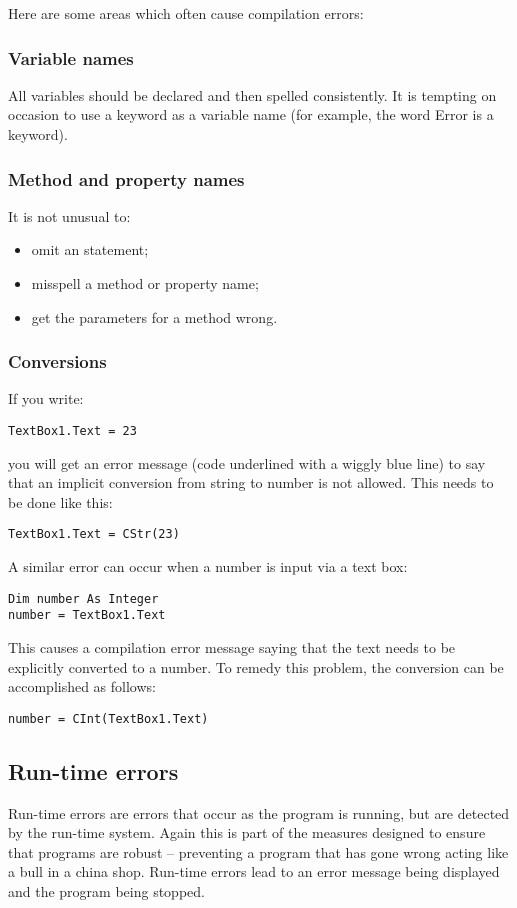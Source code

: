 			Here are some areas which often cause compilation errors:
		

			\subsubsection*{Variable names}
				All variables should be declared and then spelled consistently. It is tempting on occasion to use a keyword as a variable name (for example, the word Error is a keyword).


			\subsubsection*{Method and property names}
				It is not unusual to:
				\begin{itemize}
					\item omit an  statement;
    		  \item misspell a method or property name;
		      \item get the parameters for a method wrong.
				\end{itemize}

				
			\subsubsection*{Conversions}
				If you write:
				\begin{lstlisting}
TextBox1.Text = 23
				\end{lstlisting}
				you will get an error message (code underlined with a wiggly blue line) to say that an implicit conversion from string to number is not allowed. This needs to be done like this:
				\begin{lstlisting}
TextBox1.Text = CStr(23)
				\end{lstlisting}
				A similar error can occur when a number is input via a text box:
				\begin{lstlisting}
Dim number As Integer
number = TextBox1.Text
				\end{lstlisting}
				This causes a compilation error message saying that the text needs to be explicitly converted to a number. To remedy this problem, the conversion can be accomplished as follows:
				\begin{lstlisting}
number = CInt(TextBox1.Text)
			\end{lstlisting}

			
		\subsection*{Run-time errors}
			Run-time errors are errors that occur as the program is running, but are detected by the run-time system. Again this is part of the measures designed to ensure that programs are robust – preventing a program that has gone wrong acting like a bull in a china shop. Run-time errors lead to an error message being displayed and the program being stopped.


